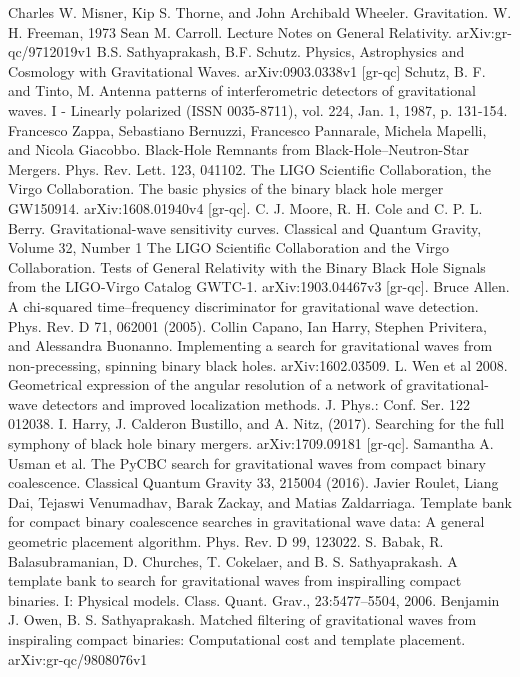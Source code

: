 \documentclass[binding=0.6cm, LaM]{sapthesis}
\begin{document}
\begin{thebibliography}{500}
	 Charles W. Misner, Kip S. Thorne, and John Archibald Wheeler. Gravitation. W. H. Freeman, 1973
	 Sean M. Carroll. Lecture Notes on General Relativity. arXiv:gr-qc/9712019v1
	 B.S. Sathyaprakash, B.F. Schutz. Physics, Astrophysics and Cosmology with Gravitational Waves. arXiv:0903.0338v1 [gr-qc]
	 Schutz, B. F. and Tinto, M. Antenna patterns of interferometric detectors of gravitational waves. I - Linearly polarized (ISSN 0035-8711), vol. 224, Jan. 1, 1987, p. 131-154.
	 Francesco Zappa, Sebastiano Bernuzzi, Francesco Pannarale, Michela Mapelli, and Nicola Giacobbo. Black-Hole Remnants from Black-Hole–Neutron-Star Mergers. Phys. Rev. Lett. 123, 041102. 
	 The LIGO Scientific Collaboration, the Virgo Collaboration. The basic physics of the binary black hole merger GW150914. arXiv:1608.01940v4 [gr-qc].
	 C. J. Moore, R. H. Cole and C. P. L. Berry. Gravitational-wave sensitivity curves. Classical and Quantum Gravity, Volume 32, Number 1
	 The LIGO Scientific Collaboration and the Virgo Collaboration. Tests of General Relativity with the Binary Black Hole Signals from the LIGO-Virgo Catalog GWTC-1. arXiv:1903.04467v3 [gr-qc].
	 Bruce Allen. A chi-squared time–frequency discriminator for gravitational wave detection. Phys. Rev. D 71, 062001 (2005).
  	 Collin Capano, Ian Harry, Stephen Privitera, and Alessandra Buonanno. Implementing a search for gravitational waves from non-precessing, spinning binary black holes. arXiv:1602.03509.
  	 L. Wen et al 2008. Geometrical expression of the angular resolution of a network of gravitational-wave detectors and improved localization methods. J. Phys.: Conf. Ser. 122 012038.
	 I. Harry, J. Calderon Bustillo, and A. Nitz, (2017). Searching for the full symphony of black hole binary mergers. arXiv:1709.09181 [gr-qc]. 
  	 Samantha A. Usman et al. The PyCBC search for gravitational waves from compact binary coalescence.  Classical Quantum Gravity 33, 215004 (2016). 
  	 Javier Roulet, Liang Dai, Tejaswi Venumadhav, Barak Zackay, and Matias Zaldarriaga. Template bank for compact binary coalescence searches in gravitational wave data: A general geometric placement algorithm. Phys. Rev. D 99, 123022. 
	 S. Babak, R. Balasubramanian, D. Churches, T. Cokelaer, and B. S. Sathyaprakash. A template bank to search for gravitational waves from inspiralling compact binaries. I: Physical models. Class. Quant. Grav., 23:5477–5504, 2006. 
	 Benjamin J. Owen, B. S. Sathyaprakash. Matched filtering of gravitational waves from inspiraling compact binaries: Computational cost and template placement. arXiv:gr-qc/9808076v1

\end{thebibliography}
\end{document}
